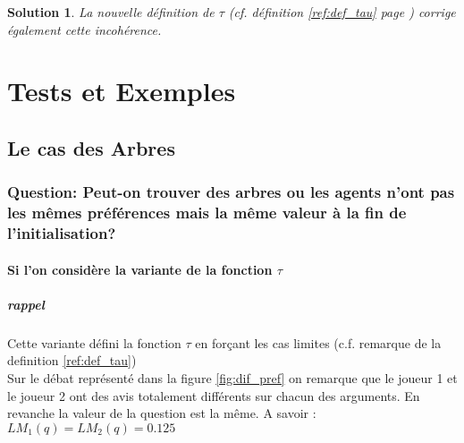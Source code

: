 \documentclass[12pt]{article}
\theoremstyle{defi}
\theoremstyle{not}
\theoremstyle{prob}
\newtheorem{solution}{Solution}[problem]
\begin{document}
\begin{solution}
    La nouvelle définition de $\tau$ (cf. définition \ref{ref:def_tau} page \pageref{ref:def_tau}) corrige également cette incohérence.
\end{solution}

\color{blue}
\section{Tests et Exemples}

\subsection{Le cas des Arbres}
\subsubsection{Question: Peut-on trouver des arbres ou les agents n'ont pas les mêmes préférences mais la même valeur à la fin de l'initialisation?\newline}

\paragraph{Si l'on considère la variante de la fonction $\tau$}

\subparagraph{rappel} Cette variante défini la fonction $\tau$ en forçant les cas limites (c.f. remarque de la definition \ref{ref:def_tau}) \\

Sur le débat représenté dans la figure \ref{fig:dif_pref} on remarque que le joueur 1 et le joueur 2 ont des avis totalement différents sur chacun des arguments. En revanche la valeur de la question est la même. A savoir : $LM_1(q) = LM_2(q) = 0.125$
\end{document}
